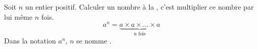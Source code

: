 Soit $n$ un entier positif. Calculer un nombre à la ,
c'est multiplier ce nombre par lui même $n$ fois.
$$a^n=\underbrace{a\times a\times...\times a}_{\text{n fois}}$$
Dans la notation $a^n$, $n$ se nomme .